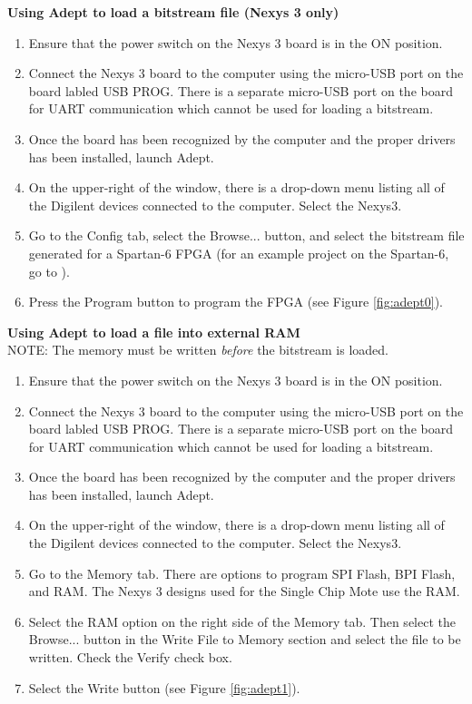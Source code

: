 \textbf{Using Adept to load a bitstream file (Nexys 3 only)}

\begin{enumerate}
	\item Ensure that the power switch on the Nexys 3 board is in the ON position.
	\item Connect the Nexys 3 board to the computer using the micro-USB port on the board labled USB PROG. There is a separate micro-USB port on the board for UART communication which cannot be used for loading a bitstream. 
	\item Once the board has been recognized by the computer and the proper drivers has been installed, launch Adept.
	\item On the upper-right of the window, there is a drop-down menu listing all of the Digilent devices connected to the computer. Select the Nexys3.
	\item Go to the Config tab, select the Browse... button, and select the bitstream file generated for a Spartan-6 FPGA (for an example project on the Spartan-6, go to ).
	\item Press the Program button to program the FPGA (see Figure \ref{fig:adept0}).
\end{enumerate}

\textbf{Using Adept to load a file into external RAM} \\

NOTE: The memory must be written {\it before} the bitstream is loaded.
\begin{enumerate}
	\item Ensure that the power switch on the Nexys 3 board is in the ON position.
	\item Connect the Nexys 3 board to the computer using the micro-USB port on the board labled USB PROG. There is a separate micro-USB port on the board for UART communication which cannot be used for loading a bitstream. 
	\item Once the board has been recognized by the computer and the proper drivers has been installed, launch Adept.
	\item On the upper-right of the window, there is a drop-down menu listing all of the Digilent devices connected to the computer. Select the Nexys3.
	\item Go to the Memory tab. There are options to program SPI Flash, BPI Flash, and RAM. The Nexys 3 designs used for the Single Chip Mote use the RAM. 			\item Select the RAM option on the right side of the Memory tab. Then select the Browse... button in the Write File to Memory section and select the file to be written. Check the Verify check box.
	\item Select the Write button (see Figure \ref{fig:adept1}).
\end{enumerate}

